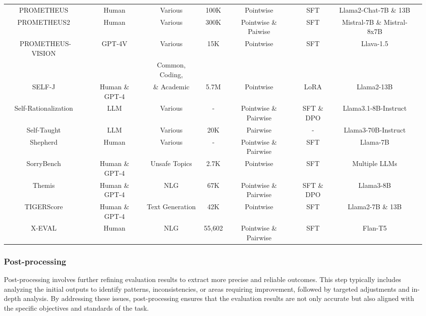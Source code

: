 \begin{table}[t]
{\begin{tabular}{cccccccc}
\rowcolor{mygray}
PROMETHEUS~\cite{kim2023prometheus}&Human&Various&100K&Pointwise&SFT&Llama2-Chat-7B \& 13B\\

PROMETHEUS2~\cite{kim2024prometheus}&Human&Various&300K&Pointwise \& Paiwise&SFT&Mistral-7B \& Mistral-8x7B\\

\rowcolor{mygray}
PROMETHEUS-VISION~\cite{lee2024prometheusvision}&GPT-4V&Various&15K&Pointwise&SFT&Llava-1.5\\

&&Common, Coding,&&&&\\
\multirow{-2}{*}{SELF-J~\cite{ye2024self}}&\multirow{-2}{*}{Human \& GPT-4}&\& Academic&\multirow{-2}{*}{5.7M}&\multirow{-2}{*}{Pointwise}&\multirow{-2}{*}{LoRA}&\multirow{-2}{*}{Llama2-13B}\\

\rowcolor{mygray}
Self-Rationalization~\cite{trivedi2024self}&LLM&Various&-&Pointwise \& Pairwise&SFT \& DPO&Llama3.1-8B-Instruct\\

Self-Taught~\cite{wang2024self}&LLM&Various&20K&Pairwise&-&Llama3-70B-Instruct\\

\rowcolor{mygray}
Shepherd~\cite{wang2023shepherd}&Human&Various&-&Pointwise \& Pairwise&SFT&Llama-7B\\

SorryBench~\cite{xie2024sorry}&Human \& GPT-4&Unsafe Topics&2.7K&Pointwise&SFT&Multiple LLMs\\

\rowcolor{mygray}
Themis~\cite{hu2024themis}&Human \& GPT-4&NLG&67K&Pointwise \& Pairwise&SFT \& DPO&Llama3-8B\\

TIGERScore~\cite{jiang2023tigerscore}&Human \& GPT-4&Text Generation&42K&Pointwise&SFT&Llama2-7B \& 13B\\

\rowcolor{mygray}
X-EVAL~\cite{liu2023x}&Human&NLG&55,602&Pointwise \& Pairwise&SFT&Flan-T5\\

\hline
\end{tabular}
}
\end{table}



\subsubsection{Post-processing}
\label{sec:Post-processing}
\par Post-processing involves further refining evaluation results to extract more precise and reliable outcomes. This step typically includes analyzing the initial outputs to identify patterns, inconsistencies, or areas requiring improvement, followed by targeted adjustments and in-depth analysis. By addressing these issues, post-processing ensures that the evaluation results are not only accurate but also aligned with the specific objectives and standards of the task.



